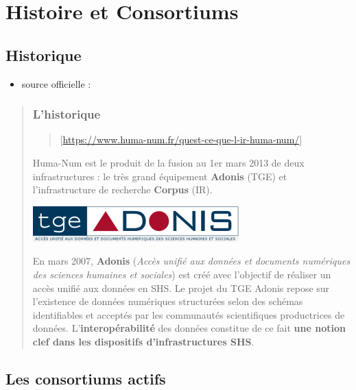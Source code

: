 \documentclass[
  letterpaper,
  DIV=11,
  numbers=noendperiod]{scrreport}
\providecommand{\tightlist}{%
  \setlength{\itemsep}{0pt}\setlength{\parskip}{0pt}}\usepackage{longtable,booktabs,array}
\begin{document}
\part{Histoire et Consortiums}

\label{consort}

\chapter{Historique}\label{historique}

\begin{itemize}
\tightlist
\item
  source officielle :
\end{itemize}

\begin{quote}
\section{L'historique}\label{lhistorique}

\begin{quote}
{[}\url{https://www.huma-num.fr/quest-ce-que-l-ir-huma-num/}{]}
\end{quote}

Huma-Num est le produit de la fusion au 1er mars 2013 de deux
infrastructures : le très grand équipement \textbf{Adonis} (TGE) et
l'infrastructure de recherche \textbf{Corpus} (IR).

\includegraphics{IMG/tge-adonis-2-300x52.png}

En mars 2007, \textbf{Adonis} (\emph{Accès unifié aux données et
documents numériques des sciences humaines et sociales}) est créé avec
l'objectif de réaliser un accès unifié aux données en SHS. Le projet du
TGE Adonis repose sur l'existence de données numériques structurées
selon des schémas identifiables et acceptés par les communautés
scientifiques productrices de données. L'\textbf{interopérabilité} des
données constitue de ce fait \textbf{une notion clef dans les
dispositifs d'infrastructures SHS}.
\end{quote}

\chapter{Les consortiums actifs}\label{les-consortiums-actifs}
\end{document}
